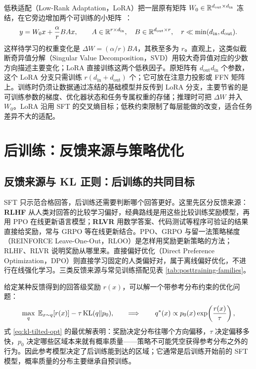 低秩适配（Low-Rank Adaptation，LoRA）把一层原有矩阵 \(W_0\in\mathbb{R}^{d_{\mathrm{out}}\times d_{\mathrm{in}}}\) 冻结，在它旁边增加两个可训练的小矩阵~\cite{hu2022lora}：
\begin{equation}
 y=W_0x+\frac{\alpha}{r}BAx,\qquad
 A\in\mathbb{R}^{r\times d_{\mathrm{in}}},\quad
 B\in\mathbb{R}^{d_{\mathrm{out}}\times r},\quad
 r\ll\min(d_{\mathrm{in}},d_{\mathrm{out}}).
\end{equation}
这样待学习的权重变化是 \(\Delta W=(\alpha/r)BA\)，其秩至多为 \(r\)。直观上，这类似截断奇异值分解（Singular Value Decomposition，SVD）用较大奇异值对应的少数方向描述主要变化；LoRA 直接训练这两个低秩因子。原矩阵有 \(d_{\mathrm{out}}d_{\mathrm{in}}\) 个参数，这个 LoRA 分支只需训练 \(r(d_{\mathrm{in}}+d_{\mathrm{out}})\) 个；它可放在注意力投影或 FFN 矩阵上。训练时仍须让数据通过冻结的基础模型并反传到 LoRA 分支，主要节省的是可训练参数的梯度、优化器状态和任务专属权重的存储；推理时可把 \(\Delta W\) 并入 \(W_0\)。LoRA 沿用 SFT 的交叉熵目标；低秩约束限制了每层能做的改变，适合任务差异不大的适配。

\section{后训练：反馈来源与策略优化}
\label{sec:post-training}

\subsection{反馈来源与 KL 正则：后训练的共同目标}

SFT 只示范合格回答，后训练还需要判断哪个回答更好。这里先区分反馈来源：\textbf{RLHF} 从人类对回答的比较学习偏好，经典路线是用这些比较训练奖励模型，再用 PPO 在线更新语言模型；\textbf{RLVR} 用数学答案、代码测试等程序可验证的结果直接给奖励，常与 GRPO 等在线更新结合。PPO、GRPO 与留一法策略梯度（REINFORCE Leave-One-Out，RLOO）是怎样用奖励更新策略的方法；RLHF、RLVR 说明奖励从哪里来。直接偏好优化（Direct Preference Optimization，DPO）则直接学习固定的人类偏好对，属于离线偏好优化，不进行在线强化学习。三类反馈来源与常见训练搭配见表 \ref{tab:posttraining-families}。

给定某种反馈得到的回答级奖励 \(r(x)\)，可以解一个带参考分布约束的优化问题：
\begin{equation}
 \max_q \; \mathbb{E}_{x\sim q}[r(x)]-\tau\,\mathrm{KL}(q\Vert p_0),
 \qquad\Longrightarrow\qquad
 q^*(x)\propto p_0(x)\exp\!\left(\frac{r(x)}{\tau}\right),\label{eq:kl-tilted-opt}
\end{equation}
式 \eqref{eq:kl-tilted-opt} 的最优解表明：奖励决定分布往哪个方向偏移，\(\tau\) 决定偏移多快，\(p_0\) 决定哪些区域本来就有概率质量——策略不可能凭空获得参考分布之外的行为。因此参考模型决定了后训练能到达的区域；它通常是后训练开始前的 SFT 模型，概率质量的分布主要继承自预训练。

